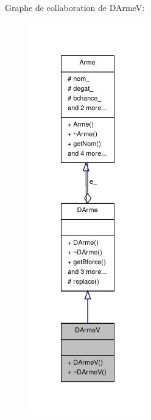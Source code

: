 Graphe de collaboration de D\-Arme\-V\-:
\nopagebreak
\begin{figure}[H]
\begin{center}
\leavevmode
\includegraphics[width=144pt]{class_d_arme_v__coll__graph}
\end{center}
\end{figure}
